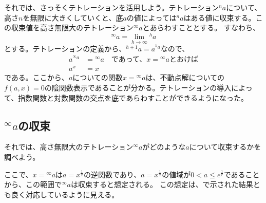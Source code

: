 	それでは、さっそくテトレーションを活用しよう。テトレーション$^n a$について、高さ$n$を無限に大きくしていくと、底$a$の値によっては$^n a$はある値に収束する。この収束値を高さ無限大のテトレーション$^\infty a$とあらわすこととする。
	すなわち、
	\begin{equation*}
		^\infty a = \lim_{h \to \infty} {^h a}
	\end{equation*}
	とする。テトレーションの定義から、$^{h+1} a = a^{^h a}$なので、
	\begin{align*}
		a ^{^\infty a} &= {^\infty a} \quad \text{であって、$x = {^\infty a}$とおけば} \\
		a^x &= x
	\end{align*}
	である。ここから、$a$についての関数$x = {^\infty a}$は、不動点解についての$f(a,x) = 0$の陰関数表示であることが分かる。テトレーションの導入によって、指数関数と対数関数の交点を底であらわすことができるようになった。
	
\subsection{$^\infty a$の収束}
	それでは、高さ無限大のテトレーション$^\infty a$がどのような$a$について収束するかを調べよう。
	
	ここで、$x = {^\infty a}$は$a = x^\frac{1}{x}$の逆関数であり、$a = x^\frac{1}{x}$の値域が$0 < a \leq e^\frac{1}{e}$であることから、この範囲で$^\infty a$は収束すると想定される。
	この想定は、で示された結果とも良く対応しているように見える。
	
